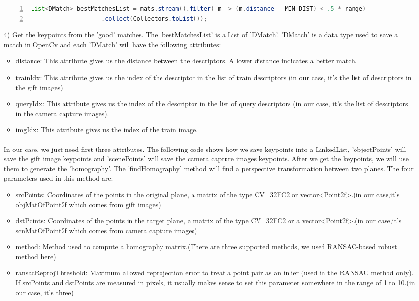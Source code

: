 \begin{enumerate}
\begin{lstlisting}[language={java},
        numbers=left,basicstyle=\footnotesize\ttfamily,breaklines=true,xleftmargin=.05\textwidth, xrightmargin=.05\textwidth]
List<DMatch> bestMatchesList = mats.stream().filter( m -> (m.distance - MIN_DIST) < .5 * range)
                    .collect(Collectors.toList());
\end{lstlisting} 
\item[4)] Get the keypoints from the 'good' matches. The {\ttfamily 'bestMatchesList'} is a List of {\ttfamily 'DMatch'}. {\ttfamily 'DMatch'} is a data type used to save a match in OpenCv and each {\ttfamily 'DMatch'} will have the following attributes:
\begin{itemize}
\item distance: This attribute gives us the distance between the descriptors. A lower distance indicates a better match.
\item trainIdx: This attribute gives us the index of the descriptor in the list of train descriptors (in our case, it’s the list of descriptors in the gift images).
\item queryIdx: This attribute gives us the index of the descriptor in the list of query descriptors (in our case, it’s the list of descriptors in the camera capture images).
\item imgIdx: This attribute gives us the index of the train image. 
\end{itemize}
\paragraph{} In our case, we just need first three attributes. The following code shows how we save keypoints into a {\ttfamily LinkedList}, {\ttfamily 'objectPoints'} will save the gift image keypoints and {\ttfamily 'scenePoints'} will save the camera capture images keypoints. After we get the keypoints, we will use them to generate the {\ttfamily 'homography'}. The {\ttfamily 'findHomography'} method will find a perspective transformation between two planes. The four parameters used in this method are:
\begin{itemize}
\item srcPoints: Coordinates of the points in the original plane, a matrix of the type CV\_32FC2 or vector\textless Point2f\textgreater.(in our case,it's objMatOfPoint2f which comes from gift images)
\item dstPoints: Coordinates of the points in the target plane, a matrix of the type CV\_32FC2 or a vector\textless Point2f\textgreater .(in our case,it's scnMatOfPoint2f which comes from camera capture images)
\item method: Method used to compute a homography matrix.(There are three supported methods, we used RANSAC-based robust method here)
\item ransacReprojThreshold: Maximum allowed reprojection error to treat a point pair as an inlier (used in the RANSAC method only). If srcPoints and dstPoints are measured in pixels, it usually makes sense to set this parameter somewhere in the range of 1 to 10.(in our case, it's three)
\end{itemize}


\end{enumerate}
